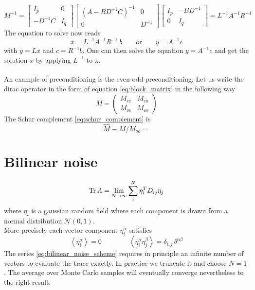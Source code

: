 \begin{equation*}
M^{-1} = \left[\begin{array}{cc}
I_p & 0 \\
-D^{-1} C & I_q
\end{array}\right]\left[\begin{array}{cc}
\left(A-B D^{-1} C\right)^{-1} & 0 \\
0 & D^{-1}
\end{array}\right]\left[\begin{array}{cc}
I_p & -B D^{-1} \\
0 & I_q
\end{array}\right]
= L^{-1} A^{-1} R^{-1}
\end{equation*}
The equation to solve now reads
\begin{equation*}
x = L^{-1} A^{-1} R^{-1} \ b \qquad \text{or} \qquad  y = A^{-1} c
\end{equation*}
with $y = L x$ and $c = R^{-1} b$. One can then solve the equation $y = A^{-1}c$ and get the solution $x$ by applying $L^{-1}$ to x. \\~\\
An example of preconditioning is the even-odd preconditioning. Let us write the dirac operator in the form of equation \eqref{eq:block_matrix} in the following way
\begin{equation*}
     M = \begin{pmatrix*}
        M_{ee} & M_{eo} \\ M_{oe} & M_{oo}
    \end{pmatrix*}
\end{equation*}
The Schur complement \eqref{eq:schur_complement} is 
\begin{equation*}
    \hat M \equiv M/M_{oo} = 
\end{equation*}

\section{Bilinear noise}
\begin{equation}
    \operatorname{\text{Tr}} {A} = \lim_{N \to \infty} \sum_i^N \eta_i^T D_{ij} \eta_j
    \label{eq:bilinear_noise_scheme}
\end{equation}
where $\eta_i$ is a gaussian random field where each component is drawn from a normal distribution $\mathcal{N}(0,1)$. \\
More precisely each vector component $\eta_i^\alpha$ satisfies
\begin{equation*}
    \left\langle \eta_i^{\alpha} \right\rangle = 0 \qquad\qquad \left\langle \eta_i^{\alpha}\eta_j^{\beta} \right\rangle = \delta_{i,j} \, \delta^{\alpha \beta}
\end{equation*}
The series \eqref{eq:bilinear_noise_scheme} requires in principle an infinite number of vectors to evaluate the trace exactly. In practice we truncate it and choose $N=1$ . The average over Monte Carlo samples will eventually converge nevertheless to the right result. \\~\\
